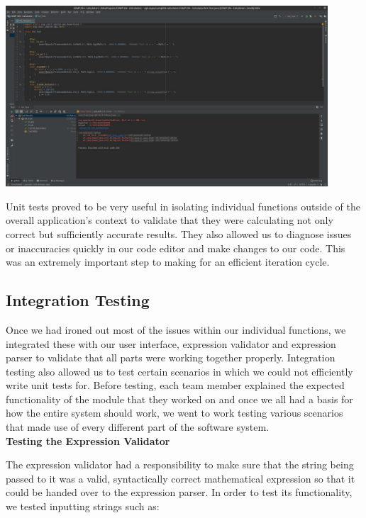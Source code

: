 \documentclass[a4paper, 12pt]{article}
\begin{document}
\vspace{8mm}
\begin{centering}
\includegraphics[width=0.9\textwidth]{Testing_1.jpg}
\end{centering}
\vspace{8mm}

Unit tests proved to be very useful in isolating individual functions outside of the overall application's context to validate that they were calculating not only correct but sufficiently accurate results. They also allowed us to diagnose issues or inaccuracies quickly in our code editor and make changes to our code. This was an extremely important step to making for an efficient iteration cycle.



\subsection{Integration Testing}

Once we had ironed out most of the issues within our individual functions, we integrated these with our user interface, expression validator and expression parser to validate that all parts were working together properly. Integration testing also allowed us to test certain scenarios in which we could not efficiently write unit tests for. Before testing, each team member explained the expected functionality of the module that they worked on and once we all had a basis for how the entire system should work, we went to work testing various scenarios that made use of every different part of the software system. 
\\

\textbf{Testing the Expression Validator}

The expression validator had a responsibility to make sure that the string being passed to it was a valid, syntactically correct mathematical expression so that it could be handed over to the expression parser. In order to test its functionality, we tested inputting strings such as:
\\
\end{document}
